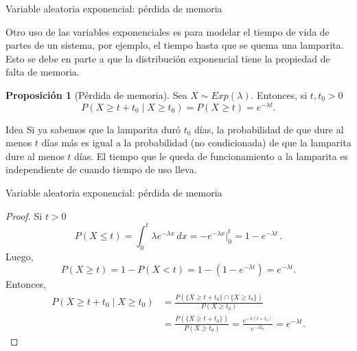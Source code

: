 \documentclass{beamer}
\theoremstyle{definition}
\newtheorem{proposition}{Proposici\'on}
\begin{document}
\begin{frame}{\color{rosee}Variable aleatoria exponencial: pérdida de memoria}\small
  \begin{block}{}
    Otro uso de las variables exponenciales es para modelar el tiempo de
    vida de partes de un sistema, por ejemplo, el tiempo hasta que se
    quema una lamparita. Esto se debe en parte a que la distribución exponencial tiene la propiedad de falta de memoria.
  \end{block}
  \begin{proposition}[P\'erdida de memoria]
    Sea $X\sim Exp(\lambda)$. Entonces, si $t, t_0 >0$
    \[P\left( X \geq t+ t_{0}\mid X\geq t_{0}\right) =P\left( X \geq
      t\right) = e^{-\lambda t}.\]
  \end{proposition}
  \begin{alertblock}{Idea}
    Si ya sabemos que la lamparita dur\'o $t_0$ d\'ias, la probabilidad
    de que dure al menos $t$ d\'ias m\'as es igual a la probabilidad
    (no condicionada) de que la lamparita dure al menos $t$ d\'ias. El
    tiempo que le queda de funcionamiento a la lamparita es
    independiente de cuando tiempo de uso lleva.
  \end{alertblock}
\end{frame}

\begin{frame}{\color{rosee}Variable aleatoria exponencial: pérdida de memoria}\small
  \begin{proof}
    Si $t>0$
    \[P\left( X \leq t\right) = \int_{0}^{t} \lambda e^{-\lambda x}
    \, dx=-e^{-\lambda x} \vert_{0}^{t}= 1 - e^{-\lambda t}\,.\] Luego,
    \[P\left( X \geq t\right) = 1 - P\left( X < t\right) = 1 - \left(1 -
    e^{-\lambda t}\right) = e^{-\lambda t}.\] Entonces,
    \begin{align*}
      P\left( X \geq t+ t_{0}\mid X\geq
      t_{0}\right)&=\frac{P\left(\{ X \geq t+ t_{0} \}\cap
        \{ X\geq t_{0} \}\right)}{P\left(X\geq t_0 \right)}\\
      &= \frac{P\left(\{ X \geq t+ t_{0}
      \}\right)}{P\left(X\geq t_0 \right)}
      =\frac{e^{-\lambda(t+t_0)}}{e^{-\lambda t_0}}=e^{-\lambda t}.
    \end{align*}
  \end{proof}
\end{frame}
\end{document}
